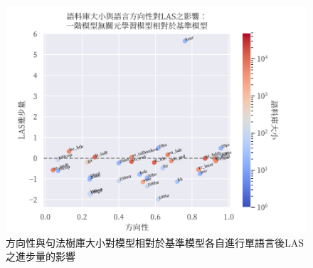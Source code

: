 \begin{figure}[h]
    \centering
    \includegraphics{figs/chapter3/dir_size_las_ft_fomaml-to-multi.pdf}
    \caption{方向性與句法樹庫大小對\fomaml 模型相對於基準模型各自進行單語言\finetune 後LAS之進步量的影響}
    \label{fig:dir-size-las-ft-fomaml-to-multi}
\end{figure}